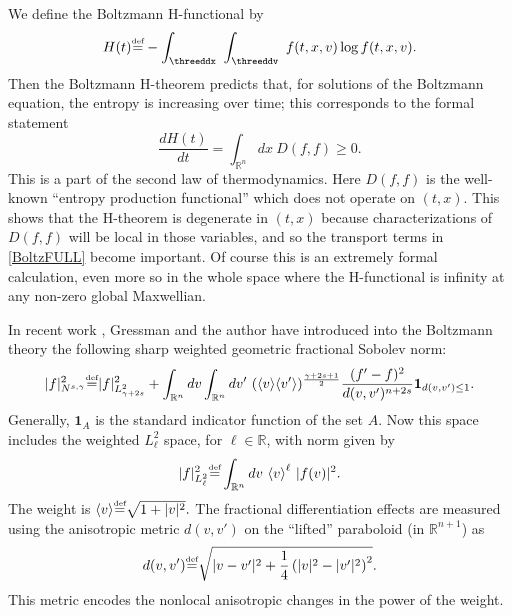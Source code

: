 \documentclass{amsart}
\numberwithin{equation}{section}
\begin{document}
We define the Boltzmann H-functional by
$$
{H}(t){\overset{\mbox{\tiny{def}}}{=}}-\int_\threeddx~ \int_\threeddv~ f(t,x,{v}) \log f(t,x,{v}).
$$
Then the Boltzmann H-theorem predicts that, for solutions of the Boltzmann equation, the entropy is increasing over time;  this corresponds to the formal statement
$$
\frac{d{H}(t)}{dt} = \int_{{\mathbb R}^{n}} dx ~ D(f,f)  \ge 0.
$$
This is a part of the second law of thermodynamics.    Here $D(f,f)$ is the well-known ``entropy production functional'' which does not operate on $(t,x)$.  This shows that the H-theorem is degenerate in $(t,x)$ because characterizations of 
$D(f,f)$ will be local in those variables,
and so the transport terms in \eqref{BoltzFULL} become important.  Of course this is an extremely formal calculation, even more so in the whole space where the H-functional is infinity at any non-zero global Maxwellian.  

In recent work \cite{gsNonCut0,gsNonCutA},
Gressman and the author have introduced into the Boltzmann theory the 
following sharp weighted geometric fractional  Sobolev norm:
\begin{equation} 
{|} f{|}_{N^{s,\gamma}}^2 
{\overset{\mbox{\tiny{def}}}{=}} 
{|} f{|}_{L^2_{\gamma+2s}}^2 + 
\int_{\mathbb{R}^n} dv \int_{\mathbb{R}^n} dv' ~
({ \left< {{v}} \right> }{ \left< {{v'}} \right> })^{\frac{\gamma+2s+1}{2}}
 \frac{(f' - f)^2}{d(v,v')^{n+2s}} 
{ {\mathbf 1}}_{d(v,v') \leq 1}. \label{normdef} 
\end{equation}
Generally, ${ {\mathbf 1}}_{A}$ is the standard indicator function of the set $A$.
Now this space includes the weighted $L^2_{\ell}$ space, for ${\ell}\in\mathbb{R}$, with norm given by
$$
{|} f{|}_{L^2_{\ell}}^2 
{\overset{\mbox{\tiny{def}}}{=}}
\int_{\mathbb{R}^n} dv ~ 
{ \left< {{v}} \right> }^{\ell}
~
|f(v)|^2.
$$
The weight is
$
{ \left< {{v}} \right> }
{\overset{\mbox{\tiny{def}}}{=}} \sqrt{1+|v|^2}.
$
The fractional differentiation effects are measured 
using the anisotropic metric $d(v,v')$ on the ``lifted'' paraboloid (in ${\mathbb{R}}^{{n}+1}$) as
$$
d(v,v') {\overset{\mbox{\tiny{def}}}{=}} \sqrt{ |v-v'|^2 + \frac{1}{4}\left( |v|^2 -  |v'|^2\right)^2}.
$$
This metric encodes the nonlocal anisotropic changes in the power of the weight. 
\end{document}
